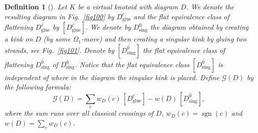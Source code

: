 \documentclass[11pt]{amsart}
\theoremstyle{noparens}
\newtheorem{definition}{Definition}[section]
\numberwithin{equation}{section}
\numberwithin{equation}{section}
\begin{document}
\begin{definition} [\cite{Pet}] \label{def4.3} {\rm 
		Let $K$ be a virtual knotoid with diagram $D$. We denote the resulting diagram in Fig.~\ref{fig100} by $D^c_{\operatorname{glue}}$ and the flat equivalence class of flattening $\overline{D^c_{\operatorname{glue}}}$ by $[\overline{D^c_{\operatorname{glue}}}]$. We denote by $D^0_{\operatorname{sing}}$ the diagram obtained by creating a kink on $D$ (by some $\Omega_1$-move) and then creating a \textit{singular kink} by gluing two strands, see Fig.~\ref{fig101}. Denote by $[\overline{D^{0}_{\operatorname{sing}}}]$ the flat equivalence class of flattening $\overline{D^{0}_{\operatorname{sing}}}$ of $D^{0}_{\operatorname{sing}}$. Notice that the  flat equivalence class $[\overline{D^{0}_{\operatorname{sing}}}]$ is independent of where in the diagram the singular kink is  placed. Define $\mathcal{G}(D)$ by the following formula: 
		\begin{equation}
		\mathcal{G} (D) = \sum_{c} w_D (c) \, [\overline{D^c_{\operatorname{glue}}}] - w(D) \, [\overline{D^0_{\operatorname{sing}}}],  \label{eqn:defG}
		\end{equation}
		where the sum runs over all classical crossings of $D$, $w_D(c) = \operatorname{sgn}(c)$ and $\displaystyle w(D) = \sum_c w_D(c)$. 
	}
\end{definition}
\end{document}
